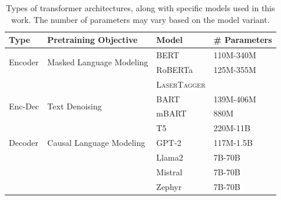 \begin{table}[t]
    \footnotesize
    \centering
    \begin{tabular}{lp{4.5cm}ll}
        \toprule
        \textbf{Type}            & \textbf{Pretraining Objective}            & \textbf{Model}                                       & \textbf{\# Parameters} \\
        \midrule
        \multirow{2}{*}{Encoder} & \multirow{2}{*}{Masked Language Modeling} & BERT \cite{devlinBERTPretrainingDeep2019}            & 110M-340M              \\
                                 &                                           & RoBERTa \cite{liuRoBERTaRobustlyOptimized2019}       & 125M-355M              \\
                                 &                                           & \textsc{LaserTagger} \cite{malmi2019lasertagger}     &                        \\
        \midrule
        \multirow{2}{*}{Enc-Dec} & \multirow{2}{*}{Text Denoising}           & BART \cite{lewisBARTDenoisingSequencetoSequence2019} & 139M-406M              \\
                                 &                                           & mBART \cite{liuMultilingualDenoisingPretraining2020} & 880M                   \\
                                 &                                           & T5 \cite{raffelExploringLimitsTransfer2019}          & 220M-11B               \\
        \midrule
        Decoder                  & Causal Language Modeling                  & GPT-2 \cite{radfordLanguageModelsAre2019}            & 117M-1.5B              \\
                                 &                                           & Llama2 \cite{touvronLlamaOpenFoundation2023}         & 7B-70B                 \\
                                 &                                           & Mistral \cite{jiangMistral7B2023}                    & 7B-70B                 \\
                                 &                                           & Zephyr \cite{tunstallZephyrDirectDistillation2023}   & 7B-70B                 \\
        \bottomrule
    \end{tabular}
    \caption{Types of transformer architectures, along with specific models used in this work. The number of parameters may vary based on the model variant.}
    \label{tab:pretrained_models}
\end{table}

